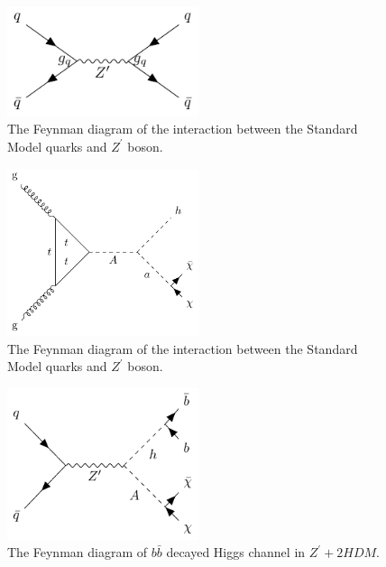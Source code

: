 \begin{figure}[htbp]
  \begin{center}
    \includegraphics[width=0.5\textwidth]{chapters/c2/figures/z-prime}
  \end{center}
  \caption{The Feynman diagram of the interaction between the Standard Model quarks and $Z^{\prime}$ boson.}
  \label{fig:c2zprime}
\end{figure}

\begin{figure}[htbp]
  \begin{center}
    \includegraphics[width=0.5\textwidth]{chapters/c2/figures/two-higgs}
  \end{center}
  \caption{The Feynman diagram of the interaction between the Standard Model quarks and $Z^{\prime}$ boson.}
  \label{fig:twohiggs}
\end{figure}

\begin{figure}[htbp]
  \begin{center}
    \includegraphics[width=0.5\textwidth]{chapters/c2/figures/z-prime-2hdm}
  \end{center}
  \caption{The Feynman diagram of $b\bar{b}$ decayed Higgs channel in $Z^{\prime}+2HDM$.}
  \label{fig:c2zprime2hdm}
\end{figure}



